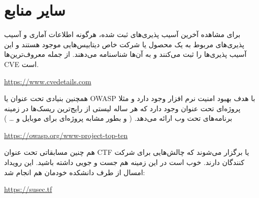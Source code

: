 \documentclass[]{article}
\begin{document}
\section*{{\titr سایر منابع}}

برای مشاهده آخرین آسیب پذیری‌های ثبت شده، هرگونه اطلاعات آماری و آسیب پذیری‌های مربوط به یک محصول یا شرکت خاص دیتابیس‌هایی موجود هستند و این آسیب پذیری‌ها را ثبت می‌کنند و به آن‌ها شناسنامه می‌دهند. از جمله معروف‌ترین‌ها CVE است.

\begin{flushleft}
\url {https://www.cvedetails.com}
\end{flushleft}
\bigskip

همچنین بنیادی تحت عنوان   یا OWASP با هدف بهبود امنیت نرم افزار وجود دارد و مثلا پروژه‌ای تحت عنوان  وجود دارد که هر ساله لیستی از رایج‌ترین ریسک‌ها در زمینه برنامه‌های تحت وب ارائه می‌دهد. ( و بطور مشابه پروژه‌ای برای موبایل و … )

\begin{flushleft}
\url{https://owasp.org/www-project-top-ten}
\end{flushleft}

\bigskip
هم چنین مسابقاتی تحت عنوان CTF یا   برگزار می‌شوند که چالش‌هایی برای شرکت کنندگان دارند. خوب است در این زمینه هم جست و جویی داشته باشید. این رویداد امسال از طرف دانشکده خودمان هم انجام شد:

\begin{flushleft}
\url{https://susec.tf}
\end{flushleft}





\newpage
\end{document}
